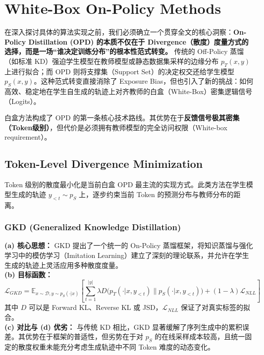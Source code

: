 \documentclass{article}
\begin{document}
\section{White-Box On-Policy Methods}
\label{sec:white_box}

在深入探讨具体的算法实现之前，我们必须确立一个贯穿全文的核心洞察：\textbf{On-Policy Distillation (OPD) 的本质不仅在于 Divergence（散度）度量方式的选择，而是一场“谁决定训练分布”的根本性范式转变。} 传统的 Off-Policy 蒸馏（如标准 KD）强迫学生模型在教师模型或静态数据集采样的边缘分布 $p_T(x, y)$ 上进行拟合；而 OPD 则将支撑集（Support Set）的决定权交还给学生模型 $p_S(x, y)$。这种范式转变直接消除了 Exposure Bias，但也引入了新的挑战：如何高效、稳定地在学生自生成的轨迹上对齐教师的白盒（White-Box）密集逻辑信号（Logits）。

白盒方法构成了 OPD 的第一条核心技术路线。其优势在于\textbf{反馈信号极其密集（Token级别）}，但代价是必须拥有教师模型的完全访问权限（White-box requirement）。

\subsection{Token-Level Divergence Minimization}
\label{subsec:token_level}

Token 级别的散度最小化是当前白盒 OPD 最主流的实现方式。此类方法在学生模型生成的轨迹 $y_{<t} \sim p_S$ 上，逐步约束当前 Token 的预测分布与教师分布的距离。

\subsubsection{GKD (Generalized Knowledge Distillation) \cite{agarwal2023gkd}}
\textbf{(a) 核心思想：} GKD 提出了一个统一的 On-Policy 蒸馏框架，将知识蒸馏与强化学习中的模仿学习（Imitation Learning）建立了深刻的理论联系，并允许在学生生成的轨迹上灵活应用多种散度度量。\\
\textbf{(b) 目标函数：}
\begin{equation}
    \mathcal{L}_{GKD} = \mathbb{E}_{x \sim \mathcal{D}, y \sim p_S(\cdot|x)} \left[ \sum_{t=1}^{|y|} \lambda D\big( p_T(\cdot|x, y_{<t}) \parallel p_S(\cdot|x, y_{<t}) \big) + (1-\lambda) \mathcal{L}_{NLL} \right]
\end{equation}
其中 $D$ 可以是 Forward KL、Reverse KL 或 JSD，$\mathcal{L}_{NLL}$ 保证了对真实标签的拟合。\\
\textbf{(c) 对比与 (d) 优劣：} 与传统 KD 相比，GKD 显著缓解了序列生成中的累积误差。其优势在于框架的普适性，但劣势在于对 $p_S$ 的在线采样成本较高，且统一固定的散度权重未能充分考虑生成轨迹中不同 Token 难度的动态变化。
\end{document}
